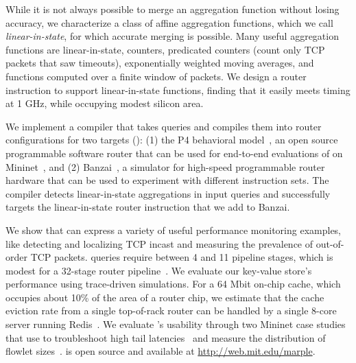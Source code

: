 While it is not always possible to merge an aggregation function without losing
accuracy, we characterize a class of affine aggregation functions, which we
call {\em linear-in-state}, for which accurate merging is possible.  Many
useful aggregation functions are linear-in-state, \eg counters, predicated
counters (\eg count only TCP packets that saw timeouts), exponentially weighted
moving averages, and functions computed over a finite window of packets.  We
design a router instruction to support linear-in-state functions, finding that
it easily meets timing at 1 GHz, while occupying modest silicon area.

 We implement a compiler that takes \TheSystem queries
and compiles them into router configurations for two targets ():
(1) the P4 behavioral model~\cite{p4-bmv2}, an open source programmable
software router that can be used for end-to-end evaluations of \TheSystem on
Mininet~\cite{mininet}, and (2) Banzai~\cite{domino_sigcomm}, a simulator for
high-speed programmable router hardware that can be used to experiment with
different instruction sets.  The \TheSystem compiler detects linear-in-state
aggregations in input queries and successfully targets the linear-in-state
router instruction that we add to Banzai.

 We show that \TheSystem can express a variety of useful
performance monitoring examples, like detecting and localizing TCP incast and
measuring the prevalence of out-of-order TCP packets. \TheSystem queries
require between 4 and 11 pipeline stages, which is modest for a 32-stage router
pipeline~\cite{rmt}. We evaluate our key-value store's performance using
trace-driven simulations. For a 64 Mbit on-chip cache, which occupies about
10\% of the area of a \tengrouter router chip, we estimate that the cache
eviction rate from a single top-of-rack router can be handled by a single
8-core server running Redis~\cite{redis}.  We evaluate \TheSystem's usability
through two Mininet case studies that use \TheSystem to troubleshoot high tail
latencies~\cite{barefoot-demo} and measure the distribution of flowlet
sizes~\cite{conga}. \TheSystem is open source and available at
\url{http://web.mit.edu/marple}.
